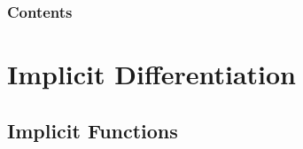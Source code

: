 \documentclass[serif,ignorenonframetext]{beamer}
\title{\commonTitleZeroTwoSix}
\subtitle{\commonSubtitleZeroTwoSix}
\author{\commonAuthor}
\institute{\commonInstitute}
\date{\commonDateZeroTwoSix}
\begin{document}

\begin{frame}
  \titlepage
\end{frame}

\begin{frame}
  \frametitle{Contents}
  \tableofcontents
\end{frame}



\section{Implicit Differentiation}

\subsection{Implicit Functions}
\end{document}
